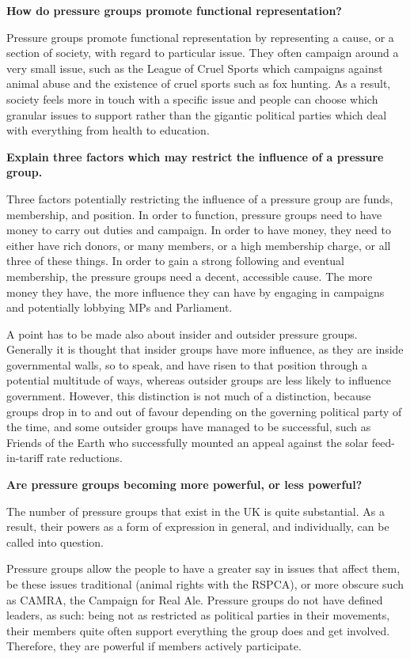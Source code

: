 \documentclass[11pt, a4paper]{article}
\begin{document}
\textbf{How do pressure groups promote functional representation?}

Pressure groups promote functional representation by representing a cause,
or a section of society, with regard to particular issue.  They often
campaign around a very small issue, such as the League of Cruel Sports
which campaigns against animal abuse and the existence of cruel sports such
as fox hunting.  As a result, society feels more in touch with a specific
issue and people can choose which granular issues to support rather than
the gigantic political parties which deal with everything from health to
education.

\textbf{Explain three factors which may restrict the influence of a
pressure group.}

Three factors potentially restricting the influence of a pressure group
are funds, membership, and position.  In order to function, pressure groups need to have money to carry out duties and campaign.  In order to have money, they need to either have rich donors, or many members, or a high membership charge, or all three of these things.  In order to gain a strong following and eventual membership, the pressure groups need a decent, accessible cause.  The more money they have, the more influence they can have by engaging in campaigns and potentially lobbying MPs and Parliament.

A point has to be made also about insider and outsider pressure groups.
Generally it is thought that insider groups have more influence, as they
are inside governmental walls, so to speak, and have risen to that
position through a potential multitude of ways, whereas outsider groups
are less likely to influence government.  However, this distinction is not
much of a distinction, because groups drop in to and out of favour
depending on the governing political party of the time, and some outsider
groups have managed to be successful, such as Friends of the Earth who
successfully mounted an appeal against the solar feed-in-tariff rate
reductions.
 
\textbf{Are pressure groups becoming more powerful, or less powerful?}

The number of pressure groups that exist in the UK is quite substantial.
As a result, their powers as a form of expression in general, and
individually, can be called into question.

Pressure groups allow the people to have a greater say in issues that affect them, be these issues traditional (animal rights with the \textsc{RSPCA}), or more obscure such as \textsc{CAMRA}, the Campaign for Real Ale.  Pressure groups do not have defined leaders, as such: being not as restricted as political parties in their movements, their members quite often support everything the group does and get involved.  Therefore, they are powerful if members actively participate.
\end{document}
